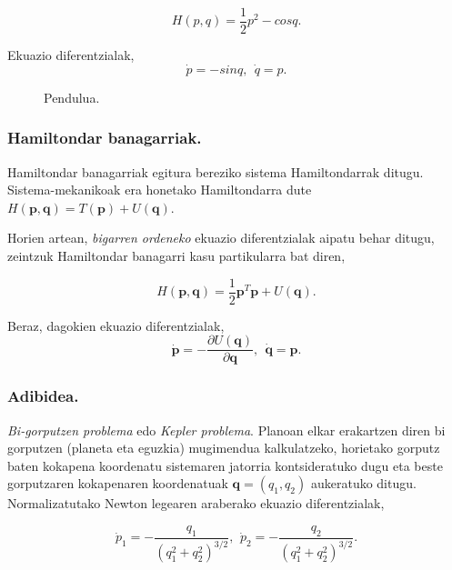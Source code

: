\begin{equation*}
H(p,q)=\frac{1}{2} p^2- cos q.
\end{equation*}

Ekuazio diferentzialak,
\begin{equation*}
\dot{p}= -sin q, \ \ \dot{q}=p.
\end{equation*}

\begin{figure}[h]
\centering
{}
\caption{ \small Pendulua.}
\label{fig:pendulua}
\end{figure}

\subsubsection*{Hamiltondar banagarriak.}

Hamiltondar banagarriak egitura bereziko sistema Hamiltondarrak ditugu. Sistema-mekanikoak era honetako Hamiltondarra dute $H(\mathbf{p},\mathbf{q})=T(\mathbf{p})+U(\mathbf{q})$.

Horien artean, \emph{bigarren ordeneko} ekuazio diferentzialak aipatu behar ditugu, zeintzuk Hamiltondar banagarri kasu partikularra bat diren,  

\begin{equation*}
H(\mathbf{p},\mathbf{q})=\frac{1}{2}\mathbf{p}^T\mathbf{p} +U(\mathbf{q}).
\end{equation*}

Beraz, dagokien ekuazio diferentzialak,
\begin{equation*}
\dot{\mathbf{p}}=-\frac{\partial U(\mathbf{q})}{\partial \mathbf{q}}, \ \ \dot{\mathbf{q}}=\mathbf{p}. 
\end{equation*}

\subsubsection*{Adibidea.}
\emph{Bi-gorputzen problema} edo \emph{Kepler problema}. Planoan elkar erakartzen diren bi gorputzen (planeta eta eguzkia) mugimendua kalkulatzeko, horietako gorputz baten kokapena koordenatu sistemaren jatorria kontsideratuko dugu eta beste gorputzaren kokapenaren koordenatuak $\mathbf{q}=(q_1,q_2)$ aukeratuko ditugu. Normalizatutako Newton legearen araberako ekuazio diferentzialak,  

\begin{equation}
\dot{p}_1= -\frac{q_1}{(q_1^2+q_2^2)^{3/2}}, \ \, \dot{p}_2= -\frac{q_2}{(q_1^2+q_2^2)^{3/2}}.
\end{equation}
  

